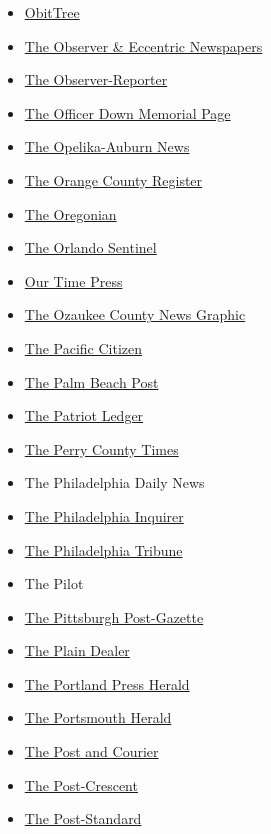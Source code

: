 \begin{itemize}
\item
  \href{https://obittree.com/}{ObitTree}
\item
  \href{https://www.hometownlife.com/}{The Observer \& Eccentric
  Newspapers}
\item
  \href{https://observer-reporter.com/}{The Observer-Reporter}
\item
  \href{https://www.odmp.org/}{The Officer Down Memorial Page}
\item
  \href{https://www.oanow.com/}{The Opelika-Auburn News}
\item
  \href{https://www.ocregister.com/}{The Orange County Register}
\item
  \href{https://www.oregonlive.com/}{The Oregonian}
\item
  \href{https://www.orlandosentinel.com/}{The Orlando Sentinel}
\item
  \href{https://www.ourtimepress.com/}{Our Time Press}
\item
  \href{https://www.gmtoday.com/}{The Ozaukee County News Graphic}
\item
  \href{https://www.pacificcitizen.org/}{The Pacific Citizen}
\item
  \href{https://www.palmbeachpost.com/}{The Palm Beach Post}
\item
  \href{https://www.patriotledger.com/}{The Patriot Ledger}
\item
  \href{https://www.pennlive.com/perry-county-times/}{The Perry County
  Times}
\item
  The Philadelphia Daily News
\item
  \href{https://www.inquirer.com/}{The Philadelphia Inquirer}
\item
  \href{https://www.phillytrib.com/}{The Philadelphia Tribune}
\item
  The Pilot
\item
  \href{https://www.post-gazette.com/}{The Pittsburgh Post-Gazette}
\item
  \href{https://www.plaindealer.com/}{The Plain Dealer}
\item
  \href{https://www.pressherald.com/}{The Portland Press Herald}
\item
  \href{https://www.seacoastonline.com/portsmouthherald}{The Portsmouth
  Herald}
\item
  \href{https://www.postandcourier.com/}{The Post and Courier}
\item
  \href{https://www.postcrescent.com/}{The Post-Crescent}
\item
  \href{https://www.syracuse.com/poststandard/}{The Post-Standard}

\end{itemize}
